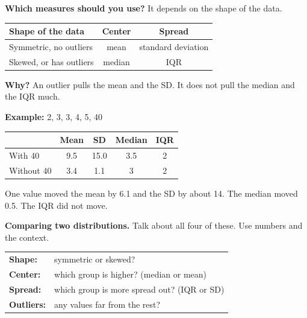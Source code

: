 \documentclass[11pt]{article}
\begin{document}

\textbf{Which measures should you use?} It depends on the shape of the data.

\vspace{0.4em}
\begin{center}
\renewcommand{\arraystretch}{1.4}
\begin{tabular}{|l|c|c|}\hline
\textbf{Shape of the data} & \textbf{Center} & \textbf{Spread} \\ \hline
Symmetric, no outliers & mean & standard deviation \\ \hline
Skewed, or has outliers & median & IQR \\ \hline
\end{tabular}
\end{center}

\textbf{Why?} An outlier pulls the mean and the SD. It does not pull the median and the IQR much.

\vspace{0.4em}
\textbf{Example:} 2, 3, 3, 4, 5, 40

\vspace{0.2em}
\renewcommand{\arraystretch}{1.3}
\begin{tabular}{|l|c|c|c|c|}\hline
 & Mean & SD & Median & IQR \\ \hline
With 40 & 9.5 & 15.0 & 3.5 & 2 \\ \hline
Without 40 & 3.4 & 1.1 & 3 & 2 \\ \hline
\end{tabular}
\qquad
\begin{minipage}{2.6in}\raggedright
One value moved the mean by 6.1 and the SD by about 14. The median moved 0.5. The IQR did not move.
\end{minipage}

\vspace{1em}
\textbf{Comparing two distributions.} Talk about all four of these. Use numbers and the context.

\vspace{0.3em}
\begin{tabular}{@{}ll}
\textbf{Shape:} & symmetric or skewed?\\
\textbf{Center:} & which group is higher? (median or mean)\\
\textbf{Spread:} & which group is more spread out? (IQR or SD)\\
\textbf{Outliers:} & any values far from the rest?\\
\end{tabular}
\end{document}
